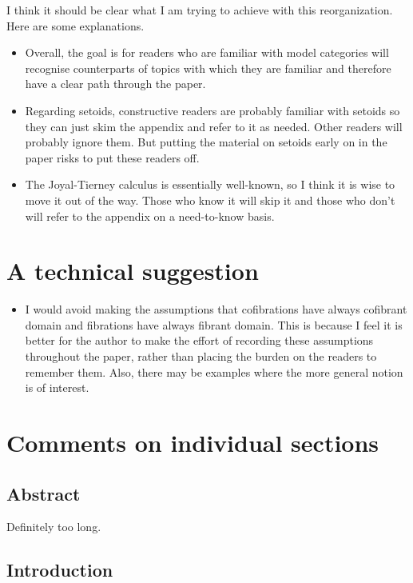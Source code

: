 \documentclass[11pt, oneside]{article}   	%
\begin{document}
\bigskip


\noindent
I think it should be clear what I am trying to achieve with this reorganization. Here are some explanations.
\begin{itemize}
\item Overall, the goal is for readers who are familiar with model categories will recognise counterparts of topics with which they are familiar and therefore have a clear path through the paper. 
\item Regarding setoids, constructive readers are probably familiar with setoids so they can just skim the appendix and refer to it as needed. Other readers will probably ignore them. But putting the material on
setoids early on in the paper risks to put these readers off. 
\item The Joyal-Tierney calculus is essentially well-known, so I think it is wise to move it out of the way. Those who know it will skip it and those who don't will refer to the appendix on a need-to-know basis.
\end{itemize}

\newpage

\section{A technical suggestion}

\begin{itemize}
\item I would avoid making the assumptions that cofibrations have always cofibrant domain and fibrations have always fibrant domain. This is because I feel it is better for the author to make the effort of recording these assumptions throughout the paper, rather than placing the burden on the readers to remember them.
Also, there may be examples where the more general notion is of interest.
\end{itemize}

\newpage

\section{Comments on individual sections}

\subsection*{Abstract}

Definitely too long.

\subsection*{Introduction}
\end{document}
